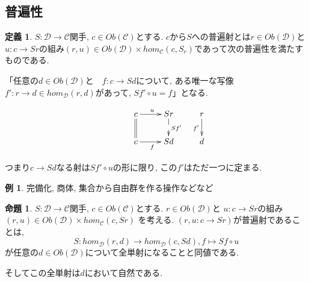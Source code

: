 \documentclass[dvipdfmx,a4paper,11pt]{report}
\theoremstyle{definition}
\newtheorem{prop}[thm]{命題}
\newtheorem{dfn}[thm]{定義}
\newtheorem{exa}[thm]{例}
\begin{document}
\subsection{普遍性}

 \begin{tcolorbox}
 [colback = white, colframe = green!35!black, fonttitle = \bfseries,breakable = true]
\begin{dfn}
$S : \mathcal{D} \to \mathcal{C}$関手, $c \in Ob(\mathcal{C})$とする.
$c$から$S$への普遍射とは$r \in Ob(\mathcal{D})$と $u: c \to Sr$の組み$(r,u) \in Ob(\mathcal{D})\times hom_{\mathcal{C}}(c, S_r)$であって次の普遍性を満たすものである.

「任意の$d \in Ob(\mathcal{D})$と　$f : c\to Sd$について, ある唯一な写像$f' : r \to d \in hom_{\mathcal{D}}(r,d)$があって, $Sf' \circ u =f$」となる.

\begin{equation*}
\xymatrix@C=25pt@R=20pt{
&c\ar@{=}[d]  \ar@{->}[r]^{u} & Sr\ar@{-->}[d]^{Sf'} &r\ar@{->}[d]_{f'}\\
&c\ar@{->}[r]_{f} &Sd&d \\   
}
\end{equation*}
\end{dfn}
つまり$c \to Sd$なる射は$Sf' \circ u$の形に限り, この$f'$はただ一つに定まる. 
 \end{tcolorbox}


\begin{exa}
完備化, 商体, 集合から自由群を作る操作などなど
\end{exa}


 \begin{tcolorbox}
 [colback = white, colframe = green!35!black, fonttitle = \bfseries,breakable = true]
\begin{prop}
\label{prop-yoneda-universe}
$S : \mathcal{D} \to \mathcal{C}$関手, $c \in Ob(\mathcal{C})$とする.
$r \in Ob(\mathcal{D})$と $u: c \to Sr$の組み$(r,u) \in Ob(\mathcal{D})\times hom_{\mathcal{C}}(c, Sr)$
を考える.
$(r,u: c\to Sr)$が普遍射であることは, 
$$
S : hom_{\mathcal{D}}(r,d) \to hom_{\mathcal{D}}(c, Sd), f \mapsto Sf \circ u
$$
が任意の$d \in Ob(\mathcal{D})$について全単射になることと同値である. 

そしてこの全単射は$d$において自然である.
\end{prop}
\end{tcolorbox}
\end{document}

